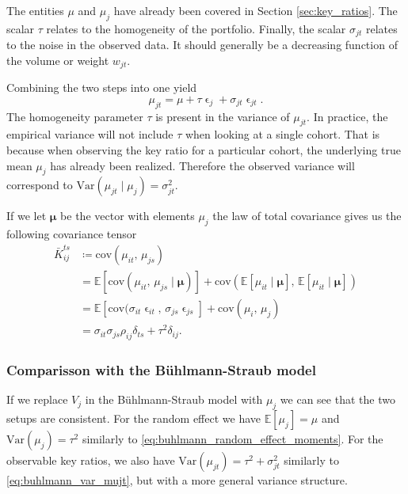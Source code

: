 \documentclass[11pt]{article}
\theoremstyle{definition}
\begin{document}
The entities $\mu$ and $\mu_j$ have already been covered in Section \ref{sec:key_ratios}. The scalar $\tau$ relates to the homogeneity of the portfolio. Finally, the scalar $\sigma_{jt}$ relates to the noise in the observed data. It should generally be a decreasing function of the volume or weight $w_{jt}$.

Combining the two steps into one yield
\begin{equation*}
    \mu_{jt} = \mu + \tau\upvarepsilon_j + \sigma_{jt}\upvarepsilon_{jt}.
\end{equation*}
The homogeneity parameter $\tau$ is present in the variance of $\mu_{jt}$. In practice, the empirical variance will not include $\tau$ when looking at a single cohort. That is because when observing the key ratio for a particular cohort, the underlying true mean $\mu_j$ has already been realized. Therefore the observed variance will correspond to $\text{Var}(\mu_{jt} \mid \mu_j) = \sigma_{jt}^2$. 

If we let $\bm\mu$ be the vector with elements $\mu_j$ the law of total covariance gives us the following covariance tensor
\begin{equation}\label{eq:k_matrix} \begin{aligned}
    \bar K^{ts}_{ij} &\coloneqq \text{cov}(\mu_{it},\, \mu_{js})  \\
    &= \mathds{E}[\text{cov}(\mu_{it},\, \mu_{js} \mid \bm \mu)] + \text{cov}(\mathds{E}[\mu_{it}\mid\bm\mu],\, \mathds{E}[\mu_{it}\mid\bm\mu])\\
    &= \mathds{E}[\text{cov}(\sigma_{it}\upvarepsilon_{it},\, \sigma_{js}\upvarepsilon_{js}] + \text{cov}(\mu_i,\, \mu_j) \\
    &= \sigma_{it}\sigma_{js}\rho_{ij}\delta_{ts} + \tau^2\delta_{ij}.
\end{aligned}
\end{equation}

\subsubsection{Comparisson with the Bühlmann-Straub model}
If we replace $V_j$ in the Bühlmann-Straub model with $\mu_j$ we can see that the two setups are consistent. For the random effect we have $\mathds{E}[\mu_j]=\mu$ and $\text{Var}(\mu_j)=\tau^2$ similarly to \eqref{eq:buhlmann_random_effect_moments}. For the observable key ratios, we also have $\text{Var}(\mu_{jt})=\tau^2+\sigma_{jt}^2$ similarly to \eqref{eq:buhlmann_var_mujt}, but with a more general variance structure.
\end{document}
